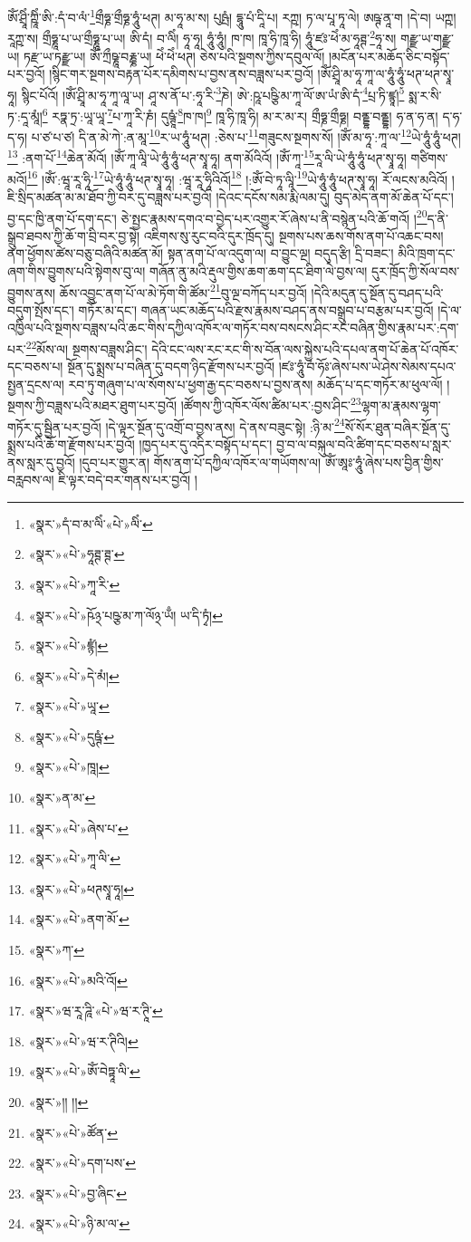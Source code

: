 ཨོཾ་ཤྲཱིཾ་ཀྵཱིཾ་ཨི་:དཾ་བ་ལཾ་\footnote{«སྣར་»དཾ་བ་མ་ལིཾ་«པེ་»ལིཾ་}གྲྀཧྞ་གྲྀཧྞ་ཧཱུཾ་ཕཊ། མ་ཧཱ་མ་ས། པུཥྤཾ། དྷཱུ་པཾ་དཱི་པ། རཀྵ། ཏ་ལ་པཱ་ཏཱ་ལེ། ཨཥྚ་ནཱ་ག །དེ་བ། ཡཀྵ། རཱཀྵ་ས། གྲྀཧྞཱ་པ་ཡ་གྲྀཧྞཱ་པ་ཡ། ཨི་དཾ། བ་ལིཾ། ཧཱ་ཧཱ། ཧཱུཾ་ཧཱུཾ། ཁ་ཁ། ཁཱ་ཧི་ཁཱ་ཧི། ཧཱུཾ་ཛཿ་ཕེཾ་མ་ཧཱཊྚ་\footnote{«སྣར་»«པེ་»ཧཱཊྚ་ཊྚ་}ཧཱ་ས། གརྫྫ་ཡ་གརྫྫ་ཡ། ཏརྫ་ཡ་ཏརྫྫ་ཡ། ཨོཾ་ཀྲྀཥྞཱ་བརྞྞ་ཡ། ཕེཾ་ཕེཾ་ཕཊ། ཅེས་པའི་སྔགས་ཀྱིས་དབུལ་ལོ། །མངོན་པར་མཆོད་ཅིང་བསྟོད་པར་བྱའོ། །སྙིང་གར་སྔགས་བརྟན་པོར་དམིགས་པ་བྱས་ནས་བཟླས་པར་བྱའོ། །ཨོཾ་ཤྲཱི་མ་ཧཱ་ཀཱ་ལ་ཧཱུཾ་ཧཱུཾ་ཕཊ་ཕཊ་སྭཱ་ཧཱ། སྙིང་པོའོ། །ཨོཾ་ཤྲཱི་མ་ཧཱ་ཀཱ་ལཱ་ཡ། ཤཱ་ས་ནོ་པ་:ཧཱ་རི་\footnote{«སྣར་»«པེ་»ཀཱ་རི་}ཎེ། ཨེ་:ཥཱ་པཥྩི་མ་ཀཱ་ལོ་ཨ་ཡཾ་ཨི་དཾ་\footnote{«སྣར་»«པེ་»ཥོ྅་པཥྩ་མ་ཀ་ལོ྅་ཡྃ། ཡ་དི་ཏྭཾ། }པྲ་ཏི་ཛྙཱ།\footnote{«སྣར་»«པེ་»ཛྙཾ།} སྨ་ར་སི་ཏ་:དཱ་མཱཾ།\footnote{«སྣར་»«པེ་»དེ་མཾ།} རཏྣ་ཏྲ་:ཡཱ་ཡཱ་\footnote{«སྣར་»«པེ་»ཡཱ་}པ་ཀཱ་རི་ཎཾ། དུཥྚཱཾ་\footnote{«སྣར་»«པེ་»དུཥྚཾ་}ཁ་ཁ།\footnote{«སྣར་»«པེ་»ཁཱ།} ཁཱ་ཧི་ཁཱ་ཧི། མ་ར་མ་ར། གྲྀཧྞ་གྲྀཧྞ། བནྡྷ་བནྡྷ། ཧ་ན་ཧ་ན། ད་ཧ་ད་ཧ། པ་ཙ་པ་ཙ། དི་ན་མེ་ཀེ་:ན་མཱ་\footnote{«སྣར་»ན་མ་}ར་ཡ་ཧཱུཾ་ཕཊ། :ཅེས་པ་\footnote{«སྣར་»«པེ་»ཞེས་པ་}གཟུངས་སྔགས་སོ། །ཨོཾ་མ་ཧཱ་:ཀཱ་ལ་\footnote{«སྣར་»«པེ་»ཀཱ་ལི་}ཡེ་ཧཱུཾ་ཧཱུཾ་ཕཊ།\footnote{«སྣར་»«པེ་»ཕཊསྭཱ་ཧཱ།} :ནག་པོ་\footnote{«སྣར་»«པེ་»ནག་མོ་}ཆེན་མོའོ། །ཨོཾ་ཀཱ་ལཱི་ཡེ་ཧཱུཾ་ཧཱུཾ་ཕཊ་སྭཱ་ཧཱ། ནག་མོའིའོ། །ཨོཾ་ཀཱ་\footnote{«སྣར་»ཀ་}རཱ་ལི་ཡེ་ཧཱུཾ་ཧཱུཾ་ཕཊ་སྭཱ་ཧཱ། གཙིགས་མའོ།\footnote{«སྣར་»«པེ་»མའི་འོ།} །ཨོཾ་:ཝཱ་རཱ་ཧཱི་\footnote{«སྣར་»ཝ་རཱ་ཌཱི་«པེ་»ཝ་ར་ཊཱི་}ཡེ་ཧཱུཾ་ཧཱུཾ་ཕཊ་སྭཱ་ཧཱ། :ཝཱ་རཱ་ཧཱིའིའོ།\footnote{«སྣར་»«པེ་»ཝ་ར་ཊིའི།} །:ཨོཾ་བེ་ཏཱ་ལཱི་\footnote{«སྣར་»«པེ་»ཨོཾ་བེཏྟཱ་ལི་}ཡེ་ཧཱུཾ་ཧཱུཾ་ཕཊ་སྭཱ་ཧཱ། རོ་ལངས་མའིའོ། །ཇི་སྲིད་མཚན་མ་མ་ཐོབ་ཀྱི་བར་དུ་བཟླས་པར་བྱའོ། །དེའང་དངོས་སམ་རྨི་ལམ་དུ། བུད་མེད་ནག་མོ་ཆེན་པོ་དང་། བྱ་དང་ཁྱི་ནག་པོ་དག་དང་། ཅེ་སྤྱང་རྣམས་དགའ་བ་བྱེད་པར་འགྱུར་རོ་ཞེས་པ་ནི་བསྙེན་པའི་ཆོ་གའོ། །\footnote{«སྣར་»།། །།}ད་ནི་སྒྲུབ་ཐབས་ཀྱི་ཆོ་ག་བྲི་བར་བྱ་སྟེ། འཇིགས་སུ་རུང་བའི་དུར་ཁྲོད་དུ། སྔགས་པས་ཆས་གོས་ནག་པོ་འཆང་བས། ནག་ཕྱོགས་ཚེས་བཅུ་བཞིའི་མཚན་མོ། སྟན་ནག་པོ་ལ་འདུག་ལ། བ་བྱུང་ལྔ། བདུད་རྩི། དྲི་བཟང་། མིའི་ཁྲག་དང་ཞག་གིས་བྱུགས་པའི་སྟེགས་བུ་ལ། གཞོན་ནུ་མའི་རྡུལ་གྱིས་ཆག་ཆག་དང་ཐིག་ལེ་བྱས་ལ། དུར་ཁྲོད་ཀྱི་སོལ་བས་བྱུགས་ནས། ཆོས་འབྱུང་ནག་པོ་ལ་མེ་ཏོག་གི་ཚོམ་\footnote{«སྣར་»«པེ་»ཚོན་}བུ་ལྔ་བཀོད་པར་བྱའོ། །དེའི་མདུན་དུ་སྔོན་དུ་བཤད་པའི་བདུག་སྤོས་དང་། གཏོར་མ་དང་། གཞན་ཡང་མཆོད་པའི་རྫས་རྣམས་བཤད་ནས་བསྒྲུབ་པ་བརྩམ་པར་བྱའོ། །དེ་ལ་འཁྱིལ་པའི་སྔགས་བཟླས་པའི་ཆང་གིས་དཀྱིལ་འཁོར་ལ་གཏོར་བས་བསངས་ཤིང་རང་བཞིན་གྱིས་རྣམ་པར་:དག་པར་\footnote{«སྣར་»«པེ་»དག་པས་}མོས་ལ། སྔགས་བཟླས་ཤིང་། དེའི་ངང་ལས་རང་རང་གི་ས་བོན་ལས་སྐྱེས་པའི་དཔལ་ནག་པོ་ཆེན་པོ་འཁོར་དང་བཅས་པ། སྔོན་དུ་སྨྲས་པ་བཞིན་དུ་བདག་ཉིད་རྫོགས་པར་བྱའོ། །ཛཿ་ཧཱུཾ་བཾ་ཧོཿ་ཞེས་པས་ཡེ་ཤེས་སེམས་དཔའ་སྤྱན་དྲངས་ལ། རབ་ཏུ་གཞུག་པ་ལ་སོགས་པ་ཕྱག་རྒྱ་དང་བཅས་པ་བྱས་ནས། མཆོད་པ་དང་གཏོར་མ་ཕུལ་ལོ། །སྔགས་ཀྱི་བཟླས་པའི་མཐར་ཐུག་པར་བྱའོ། །ཚོགས་ཀྱི་འཁོར་ལོས་ཚིམ་པར་:བྱས་ཤིང་\footnote{«སྣར་»«པེ་»བྱ་ཞིང་}ལྷག་མ་རྣམས་ལྷག་གཏོར་དུ་སྦྱིན་པར་བྱའོ། །དེ་ལྟར་སྔོན་དུ་འགྲོ་བ་བྱས་ནས། དེ་ནས་བཟུང་སྟེ། :ཉི་མ་\footnote{«སྣར་»«པེ་»ཉི་མ་ལ་}སོ་སོར་ཐུན་བཞིར་སྔོན་དུ་སྨྲས་པའི་ཆོ་ག་རྫོགས་པར་བྱའོ། །ཁྱད་པར་དུ་འདིར་བསྟོད་པ་དང་། བྱ་བ་ལ་བསྐུལ་བའི་ཚིག་དང་བཅས་པ་སླར་ནས་སླར་དུ་བྱའོ། །དུབ་པར་གྱུར་ན། གོས་ནག་པོ་དཀྱིལ་འཁོར་ལ་གཡོགས་ལ། ཨོཾ་ཨཱཿ་ཧཱུཾ་ཞེས་པས་བྱིན་གྱིས་བརླབས་ལ། ཇི་ལྟར་བདེ་བར་གནས་པར་བྱའོ། །

